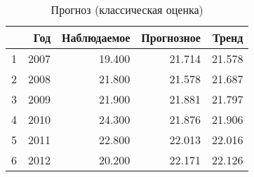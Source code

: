 \begin{table}[ht]
\centering
\begin{tabular}{rrrrr}
  \hline
 & Год & Наблюдаемое & Прогнозное & Тренд \\ 
  \hline
1 & 2007 & 19.400 & 21.714 & 21.578 \\ 
  2 & 2008 & 21.800 & 21.578 & 21.687 \\ 
  3 & 2009 & 21.900 & 21.881 & 21.797 \\ 
  4 & 2010 & 24.300 & 21.876 & 21.906 \\ 
  5 & 2011 & 22.800 & 22.013 & 22.016 \\ 
  6 & 2012 & 20.200 & 22.171 & 22.126 \\ 
   \hline
\end{tabular}
\caption{Прогноз (классическая оценка)} 
\label{table:prediction-classical}
\end{table}
